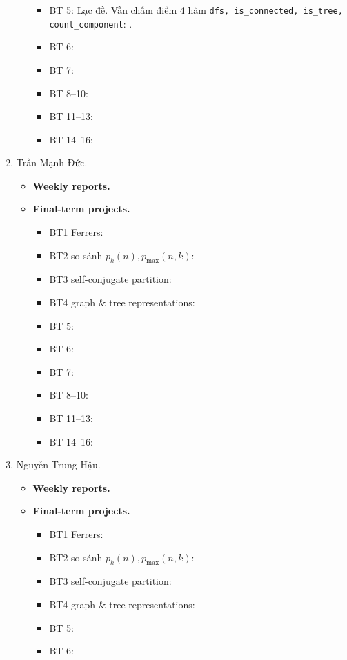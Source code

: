 \documentclass{article}
\begin{document}
\begin{enumerate}
\begin{itemize}
\begin{itemize}
            \item BT 5: Lạc đề. Vẫn chấm điểm 4 hàm \verb|dfs, is_connected, is_tree, count_component|: .
            \item BT 6:
            \item BT 7:
            \item BT 8--10:
            \item BT 11--13:
            \item BT 14--16:
        \end{itemize}
    \end{itemize}
    \item {\sc Trần Mạnh Đức.}
    \begin{itemize}
        \item {\bf Weekly reports.}
        \item {\bf Final-term projects.}
        \begin{itemize}
            \item BT1 Ferrers:
            \item BT2 so sánh $p_k(n),p_{\max}(n,k)$:
            \item BT3 self-conjugate partition:
            \item BT4 graph \& tree representations:
            \item BT 5:
            \item BT 6:
            \item BT 7:
            \item BT 8--10:
            \item BT 11--13:
            \item BT 14--16:
        \end{itemize}
    \end{itemize}
    \item {\sc Nguyễn Trung Hậu.}
    \begin{itemize}
        \item {\bf Weekly reports.}
        \item {\bf Final-term projects.}
        \begin{itemize}
            \item BT1 Ferrers:
            \item BT2 so sánh $p_k(n),p_{\max}(n,k)$:
            \item BT3 self-conjugate partition:
            \item BT4 graph \& tree representations:
            \item BT 5:
            \item BT 6:

\end{itemize}
\end{itemize}
\end{enumerate}
\end{document}
